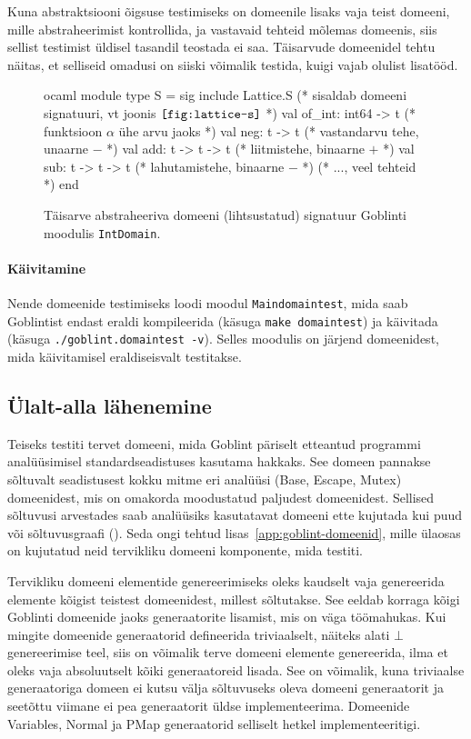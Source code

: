 \documentclass[../thesis.tex]{subfiles}
\begin{document}
Kuna abstraktsiooni õigsuse testimiseks on domeenile lisaks vaja teist domeeni, mille abstraheerimist kontrollida, ja vastavaid tehteid mõlemas domeenis, siis sellist testimist üldisel tasandil teostada ei saa. Täisarvude domeenidel tehtu näitas, et selliseid omadusi on siiski võimalik testida, kuigi vajab olulist lisatööd.

\begin{figure}
	\centering
	\begin{bminted}[mathescape]{ocaml}
		module type S =
		sig
		  include Lattice.S (* sisaldab domeeni signatuuri, vt joonis $\texttt{\ref{fig:lattice-s}}$ *)
		  val of_int: int64 -> t (* funktsioon $\alpha$ ühe arvu jaoks *)
		  val neg: t -> t (* vastandarvu tehe, unaarne $-$ *)
		  val add: t -> t -> t (* liitmistehe, binaarne $+$ *)
		  val sub: t -> t -> t (* lahutamistehe, binaarne $-$ *)
		  (* ..., veel tehteid *)
		end
	\end{bminted}
	\caption{Täisarve abstraheeriva domeeni (lihtsustatud) signatuur Goblinti moodulis \texttt{IntDomain}.}
	\label{fig:intdomain-s}
\end{figure}

\paragraph{Käivitamine}
Nende domeenide testimiseks loodi moodul \texttt{Maindomaintest}, mida saab Goblintist endast eraldi kompileerida (käsuga \texttt{make domaintest}) ja käivitada (käsuga \texttt{./goblint.domaintest -v}). Selles moodulis on järjend domeenidest, mida käivitamisel eraldiseisvalt testitakse.

\subsection{Ülalt-alla lähenemine}
Teiseks testiti tervet domeeni, mida Goblint päriselt etteantud programmi analüüsimisel standardseadistuses kasutama hakkaks. See domeen pannakse sõltuvalt seadistusest kokku mitme eri analüüsi (Base, Escape, Mutex) domeenidest, mis on omakorda moodustatud paljudest domeenidest. Sellised sõltuvusi arvestades saab analüüsiks kasutatavat domeeni ette kujutada kui puud või sõltuvusgraafi (). Seda ongi tehtud lisas~\ref{app:goblint-domeenid}, mille ülaosas on kujutatud neid tervikliku domeeni komponente, mida testiti.

Tervikliku domeeni elementide genereerimiseks oleks kaudselt vaja genereerida elemente kõigist teistest domeenidest, millest sõltutakse. See eeldab korraga kõigi Goblinti domeenide jaoks generaatorite lisamist, mis on väga töömahukas. Kui mingite domeenide generaatorid defineerida triviaalselt, näiteks alati $\bot$ genereerimise teel, siis on võimalik terve domeeni elemente genereerida, ilma et oleks vaja absoluutselt kõiki generaatoreid lisada. See on võimalik, kuna triviaalse generaatoriga domeen ei kutsu välja sõltuvuseks oleva domeeni generaatorit ja seetõttu viimane ei pea generaatorit üldse implementeerima. Domeenide Variables, Normal ja PMap generaatorid selliselt hetkel implementeeritigi.
\end{document}
